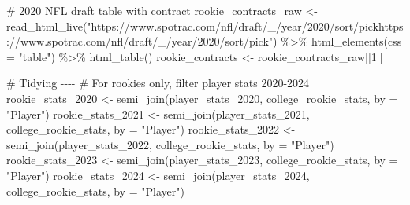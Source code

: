 \documentclass[
  letterpaper,
  DIV=11,
  numbers=noendperiod]{scrartcl}
\newenvironment{Shaded}{\begin{snugshade}}{\end{snugshade}}
\newcommand{\AttributeTok}[1]{\textcolor[rgb]{0.40,0.45,0.13}{#1}}
\newcommand{\CommentTok}[1]{\textcolor[rgb]{0.37,0.37,0.37}{#1}}
\newcommand{\DecValTok}[1]{\textcolor[rgb]{0.68,0.00,0.00}{#1}}
\newcommand{\FunctionTok}[1]{\textcolor[rgb]{0.28,0.35,0.67}{#1}}
\newcommand{\NormalTok}[1]{\textcolor[rgb]{0.00,0.23,0.31}{#1}}
\newcommand{\OtherTok}[1]{\textcolor[rgb]{0.00,0.23,0.31}{#1}}
\newcommand{\SpecialCharTok}[1]{\textcolor[rgb]{0.37,0.37,0.37}{#1}}
\newcommand{\StringTok}[1]{\textcolor[rgb]{0.13,0.47,0.30}{#1}}
\begin{document}
\begin{Shaded}
\begin{Highlighting}[]
\CommentTok{\# 2020 NFL draft table with contract}
\NormalTok{rookie\_contracts\_raw }\OtherTok{\textless{}{-}} \FunctionTok{read\_html\_live}\NormalTok{(}\StringTok{"https://www.spotrac.com/nfl/draft/\_/year/2020/sort/pickhttps://www.spotrac.com/nfl/draft/\_/year/2020/sort/pick"}\NormalTok{) }\SpecialCharTok{\%\textgreater{}\%}
  \FunctionTok{html\_elements}\NormalTok{(}\AttributeTok{css =} \StringTok{"table"}\NormalTok{) }\SpecialCharTok{\%\textgreater{}\%}
  \FunctionTok{html\_table}\NormalTok{()}
\NormalTok{rookie\_contracts }\OtherTok{\textless{}{-}}\NormalTok{ rookie\_contracts\_raw[[}\DecValTok{1}\NormalTok{]]}

\CommentTok{\# Tidying {-}{-}{-}{-}}
\CommentTok{\# For rookies only, filter player stats 2020{-}2024}
\NormalTok{rookie\_stats\_2020 }\OtherTok{\textless{}{-}} \FunctionTok{semi\_join}\NormalTok{(player\_stats\_2020, college\_rookie\_stats, }\AttributeTok{by =} \StringTok{"Player"}\NormalTok{)}
\NormalTok{rookie\_stats\_2021 }\OtherTok{\textless{}{-}} \FunctionTok{semi\_join}\NormalTok{(player\_stats\_2021, college\_rookie\_stats, }\AttributeTok{by =} \StringTok{"Player"}\NormalTok{)}
\NormalTok{rookie\_stats\_2022 }\OtherTok{\textless{}{-}} \FunctionTok{semi\_join}\NormalTok{(player\_stats\_2022, college\_rookie\_stats, }\AttributeTok{by =} \StringTok{"Player"}\NormalTok{)}
\NormalTok{rookie\_stats\_2023 }\OtherTok{\textless{}{-}} \FunctionTok{semi\_join}\NormalTok{(player\_stats\_2023, college\_rookie\_stats, }\AttributeTok{by =} \StringTok{"Player"}\NormalTok{)}
\NormalTok{rookie\_stats\_2024 }\OtherTok{\textless{}{-}} \FunctionTok{semi\_join}\NormalTok{(player\_stats\_2024, college\_rookie\_stats, }\AttributeTok{by =} \StringTok{"Player"}\NormalTok{)}


\end{Highlighting}
\end{Shaded}
\end{document}

